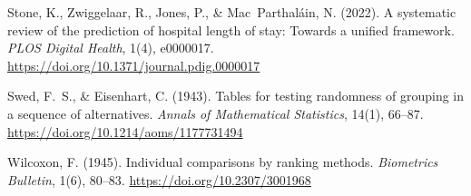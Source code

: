 \documentclass[12pt]{article}
\begin{document}
\begin{enumerate}[label={[\arabic*]}, leftmargin=*, nosep]
\item Stone, K., Zwiggelaar, R., Jones, P., \& Mac~Parthal\'{a}in, N.
  (2022). A systematic review of the prediction of hospital length
  of stay: Towards a unified framework. \textit{PLOS Digital Health},
  1(4), e0000017.
  \url{https://doi.org/10.1371/journal.pdig.0000017}

\item Swed, F.~S., \& Eisenhart, C. (1943). Tables for testing
  randomness of grouping in a sequence of alternatives.
  \textit{Annals of Mathematical Statistics}, 14(1), 66--87.
  \url{https://doi.org/10.1214/aoms/1177731494}

\item Wilcoxon, F. (1945). Individual comparisons by ranking methods.
  \textit{Biometrics Bulletin}, 1(6), 80--83.
  \url{https://doi.org/10.2307/3001968}

\end{enumerate}
\end{document}

